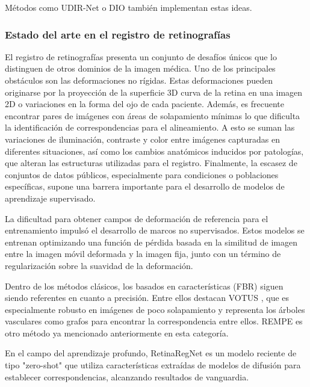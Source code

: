 Métodos como UDIR-Net \cite{undefreg} o DIO \cite{Jena_2025} también implementan estas ideas.

\subsubsection{Estado del arte en el registro de retinografías}\label{subsubsec:Estado_da_arte_no_rexistro_de_retinografías}

El registro de retinografías presenta un conjunto de desafíos únicos que lo distinguen de otros dominios de la imagen médica.
Uno de los principales obstáculos son las deformaciones no rígidas. Estas deformaciones pueden originarse por la proyección de la superficie 3D curva de la retina en una imagen 2D o variaciones en la forma del ojo de cada paciente. Además, es frecuente encontrar pares de imágenes con áreas de solapamiento mínimas lo que dificulta la identificación de correspondencias para el alineamiento. A esto se suman las variaciones de iluminación, contraste y color entre imágenes capturadas en diferentes situaciones, así como los cambios anatómicos inducidos por patologías, que alteran las estructuras utilizadas para el registro.
Finalmente, la escasez de conjuntos de datos públicos, especialmente para condiciones o poblaciones específicas, supone una barrera importante para el desarrollo de modelos de aprendizaje supervisado.

La dificultad para obtener campos de deformación de referencia para el entrenamiento impulsó el desarrollo de marcos no supervisados. Estos modelos se entrenan optimizando una función de pérdida basada en la similitud de imagen entre la imagen móvil deformada y la imagen fija, junto con un término de regularización sobre la suavidad de la deformación.

Dentro de los métodos clásicos, los basados en características (FBR) siguen siendo referentes en cuanto a precisión. Entre ellos destacan VOTUS \cite{Votus}, que es especialmente robusto en imágenes de poco solapamiento y representa los árboles vasculares como grafos para encontrar la correspondencia entre ellos. REMPE \cite{rempe} es otro método ya mencionado anteriormente en esta categoría.

En el campo del aprendizaje profundo, RetinaRegNet \cite{sivaraman2024retinaregnetzeroshotapproachretinal} es un modelo reciente de tipo "zero-shot" que utiliza características extraídas de modelos de difusión para establecer correspondencias, alcanzando resultados de vanguardia.

